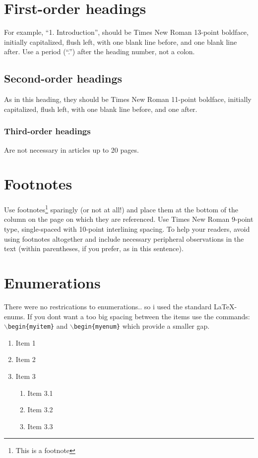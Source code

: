 \documentclass[11pt]{scrartcl}
\begin{document}
\section{First-order headings}
For example, “1. Introduction”, should be Times New Roman 13-point boldface, initially capitalized, flush left, with one blank line before, and one blank line after. Use a period (“.”) after the heading number, not a colon.

\subsection{Second-order headings}
As in this heading, they should be Times New Roman 11-point boldface, initially capitalized, flush left, with one blank line before, and one after.

\subsubsection{Third-order headings} Are not necessary in articles up to 20 pages.

\section{Footnotes}
Use footnotes\footnote{This is a footnote} sparingly (or not at all!) and place them at the bottom of the column on the page on which they are referenced. Use Times New Roman 9-point type, single-spaced with 10-point interlining spacing. To help your readers, avoid using footnotes altogether and include necessary peripheral observations in the text (within parentheses, if you prefer, as in this sentence).

\section{Enumerations}
There were no restrications to enumerations.. so i used the standard \LaTeX -enums. If you dont want a too big spacing between the items use the commands: \texttt{$\backslash$begin\{myitem\}} and \texttt{$\backslash$begin\{myenum\}} which provide a smaller gap.

\begin{enumerate}
	\item Item 1
	\item Item 2
	\item Item 3
	\begin{enumerate}
		\item Item 3.1
		\item Item 3.2
		\item Item 3.3
	\end{enumerate}
\end{enumerate}
\end{document}

